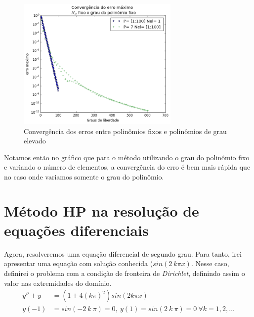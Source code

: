 \begin{figure}[!hb]
  \includegraphics[width=0.7\textwidth,center]{figuras/convergencia_erro_FEM2.png}
  \caption{Convergência dos erros entre polinômios fixos e polinômios de grau elevado}
\end{figure}

 Notamos então no gráfico  que para o método utilizando o grau do polinômio fixo e variando o número de elementos, a convergência do erro é bem mais rápida que no caso onde variamos somente o grau do polinômio.
\section{Método HP na resolução de equações diferenciais}

 Agora, resolveremos uma equação diferencial de segundo grau. Para tanto, irei apresentar uma equação com solução conhecida ($sin(2\ k \pi x)$. Nesse caso, definirei o problema com a condição de fronteira de \emph{Dirichlet}, definindo assim o valor nas extremidades do domínio.
\begin{align}
y'' + y &= (1 + 4 (k \pi)^2)sin(2 k \pi x) \\
y(-1) &= sin(-2\ k \ \pi ) = 0 ,\ y(1) = sin(2\ k\ \pi) = 0 \ \forall k = 1,2,\dots \\
\end{align}	
 
